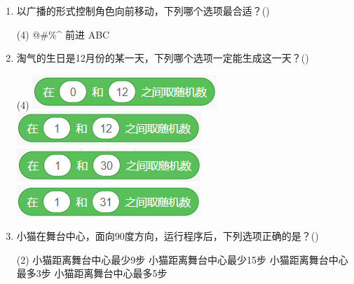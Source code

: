 \documentclass[10pt, a4paper]{article}
\newcommand{\hq}{\hfill(\qquad)}
\begin{document}
\begin{enumerate}
        \newpage
        \item 以广播的形式控制角色向前移动，下列哪个选项最合适？\hq
        \begin{tasks}(4)
            \task @\#\%\^{}
            \task 前进
            \task ABC
        \end{tasks}

        \item 淘气的生日是12月份的某一天，下列哪个选项一定能生成这一天？\hq
        \begin{tasks}(4)
            \task \includegraphics[width=.18\textwidth]{figure/8a.png}
            \task \includegraphics[width=.18\textwidth]{figure/8b.png}
            \task \includegraphics[width=.18\textwidth]{figure/8c.png}
            \task \includegraphics[width=.18\textwidth]{figure/8d.png}
        \end{tasks}

        \item 小猫在舞台中心，面向90度方向，运行程序后，下列选项正确的是？\hq
        \begin{tasks}(2)
            \task 小猫距离舞台中心最少9步
            \task 小猫距离舞台中心最少15步
            \task 小猫距离舞台中心最多3步
            \task 小猫距离舞台中心最多5步
        \end{tasks}


\end{enumerate}
\end{document}
